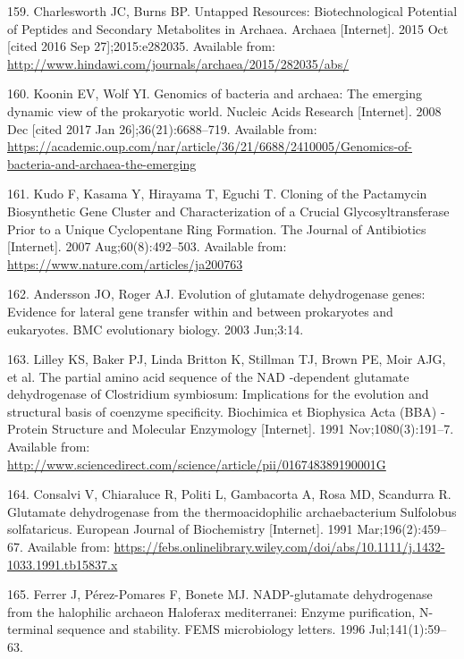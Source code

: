 \documentclass[12pt,twoside]{reedthesis}
\begin{document}
  \hypertarget{ref-charlesworth_untapped_natural_products_Archaea_2015}{}
  159. Charlesworth JC, Burns BP. Untapped Resources: Biotechnological
  Potential of Peptides and Secondary Metabolites in Archaea. Archaea
  {[}Internet{]}. 2015 Oct {[}cited 2016 Sep 27{]};2015:e282035. Available
  from: \url{http://www.hindawi.com/journals/archaea/2015/282035/abs/}
  
  \hypertarget{ref-koonin_genomics_2008}{}
  160. Koonin EV, Wolf YI. Genomics of bacteria and archaea: The emerging
  dynamic view of the prokaryotic world. Nucleic Acids Research
  {[}Internet{]}. 2008 Dec {[}cited 2017 Jan 26{]};36(21):6688--719.
  Available from:
  \url{https://academic.oup.com/nar/article/36/21/6688/2410005/Genomics-of-bacteria-and-archaea-the-emerging}
  
  \hypertarget{ref-kudo_cloning_2007}{}
  161. Kudo F, Kasama Y, Hirayama T, Eguchi T. Cloning of the Pactamycin
  Biosynthetic Gene Cluster and Characterization of a Crucial
  Glycosyltransferase Prior to a Unique Cyclopentane Ring Formation. The
  Journal of Antibiotics {[}Internet{]}. 2007 Aug;60(8):492--503.
  Available from: \url{https://www.nature.com/articles/ja200763}
  
  \hypertarget{ref-andersson_evolution_2003}{}
  162. Andersson JO, Roger AJ. Evolution of glutamate dehydrogenase genes:
  Evidence for lateral gene transfer within and between prokaryotes and
  eukaryotes. BMC evolutionary biology. 2003 Jun;3:14.
  
  \hypertarget{ref-lilley_partial_1991}{}
  163. Lilley KS, Baker PJ, Linda Britton K, Stillman TJ, Brown PE, Moir
  AJG, et al. The partial amino acid sequence of the NAD -dependent
  glutamate dehydrogenase of Clostridium symbiosum: Implications for the
  evolution and structural basis of coenzyme specificity. Biochimica et
  Biophysica Acta (BBA) - Protein Structure and Molecular Enzymology
  {[}Internet{]}. 1991 Nov;1080(3):191--7. Available from:
  \url{http://www.sciencedirect.com/science/article/pii/016748389190001G}
  
  \hypertarget{ref-consalvi_glutamate_1991}{}
  164. Consalvi V, Chiaraluce R, Politi L, Gambacorta A, Rosa MD,
  Scandurra R. Glutamate dehydrogenase from the thermoacidophilic
  archaebacterium Sulfolobus solfataricus. European Journal of
  Biochemistry {[}Internet{]}. 1991 Mar;196(2):459--67. Available from:
  \url{https://febs.onlinelibrary.wiley.com/doi/abs/10.1111/j.1432-1033.1991.tb15837.x}
  
  \hypertarget{ref-ferrer_nadp-glutamate_1996}{}
  165. Ferrer J, Pérez-Pomares F, Bonete MJ. NADP-glutamate dehydrogenase
  from the halophilic archaeon Haloferax mediterranei: Enzyme
  purification, N-terminal sequence and stability. FEMS microbiology
  letters. 1996 Jul;141(1):59--63.
  
\end{document}
